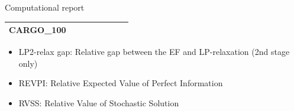 \documentclass{beamer}
\def\eight{\fontsize{8pt}{8pt}\selectfont}
\begin{document}
\begin{frame}{Computational report}
\begin{table}[H]
{\begin{tabular}{|l|ll|ll|l|l|l|}
					CARGO\_100                     &                                 &                                &                                  &                                 &                                    &                            &                            \\ \hline	
				\end{tabular}%
				}
		\end{table}
		\begin{itemize}
			\item LP2-relax gap: Relative gap between the EF and LP-relaxation (2nd stage only)
			\item REVPI: Relative Expected Value of Perfect Information
			\item RVSS: Relative Value of Stochastic Solution
		\end{itemize}
	\end{frame}
%
%	
\end{document}
